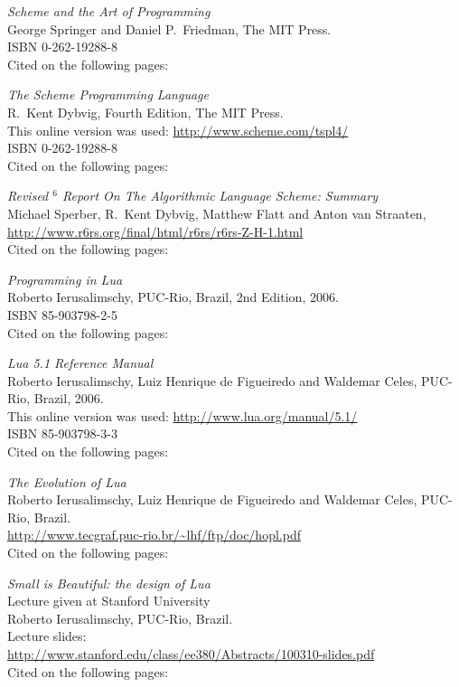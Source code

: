 \begin{thebibliography}{99}

  \emph{Scheme and the Art of Programming} \\
  George Springer and Daniel P.\ Friedman,
  The MIT Press. \\
  ISBN 0-262-19288-8 \\
  Cited on the following pages: 

  \emph{The Scheme Programming Language} \\
  R.\ Kent Dybvig,
  Fourth Edition,
  The MIT Press. \\
  This online version was used: \url{http://www.scheme.com/tspl4/} \\
  ISBN 0-262-19288-8 \\
  Cited on the following pages: 

  \emph{Revised $^6$ Report On The Algorithmic Language Scheme: Summary} \\
  Michael Sperber, R.\ Kent Dybvig, Matthew Flatt and Anton van Straaten, \\
  \url{http://www.r6rs.org/final/html/r6rs/r6rs-Z-H-1.html} \\
  Cited on the following pages: 

  \emph{Programming in Lua} \\
  Roberto Ierusalimschy,
  PUC-Rio, Brazil,
  2nd Edition,
  2006. \\
  ISBN 85-903798-2-5 \\
  Cited on the following pages: 
  
  \emph{Lua 5.1 Reference Manual} \\
  Roberto Ierusalimschy, Luiz Henrique de Figueiredo and Waldemar Celes,
  PUC-Rio, Brazil,
  2006. \\
  This online version was used: \url{http://www.lua.org/manual/5.1/} \\
  ISBN 85-903798-3-3 \\
  Cited on the following pages: 
  
  \emph{The Evolution of Lua} \\
  Roberto Ierusalimschy, Luiz Henrique de Figueiredo and Waldemar Celes,
  PUC-Rio, Brazil. \\
  \url{http://www.tecgraf.puc-rio.br/~lhf/ftp/doc/hopl.pdf} \\
  Cited on the following pages: 
  
  \emph{Small is Beautiful: the design of Lua} \\
  Lecture given at Stanford University \\
  Roberto Ierusalimschy,
  PUC-Rio, Brazil. \\
  Lecture slides: \\
  \url{http://www.stanford.edu/class/ee380/Abstracts/100310-slides.pdf} \\
  Cited on the following pages: 


\end{thebibliography}
